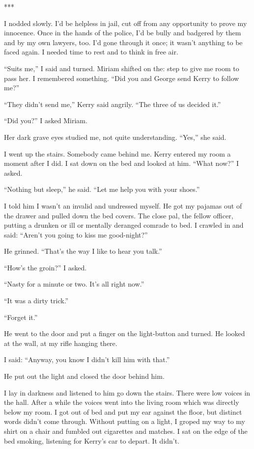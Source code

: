 \documentclass{novel}
\begin{document}
***

I nodded slowly. I’d be helpless in jail, cut off from any opportunity to prove my innocence. Once in the hands of the police, I’d be bully and badgered by them and by my own lawyers, too. I’d gone through it once; it wasn’t anything to be faced again. I needed time to rest and to think in free air.

“Suits me,” I said and turned. Miriam shifted on the: step to give me room to pass her. I remembered something. “Did you and George send Kerry to follow me?”

“They didn’t send me,” Kerry said angrily. “The three of us decided it.”

“Did you?” I asked Miriam.

Her dark grave eyes studied me, not quite understanding. “Yes,” she said.

I went up the stairs. Somebody came behind me. Kerry entered my room a moment after I did. I sat down on the bed and looked at him. “What now?” I asked.

“Nothing but sleep,” he said. “Let me help you with your shoes.”

I told him I wasn’t an invalid and undressed myself. He got my pajamas out of the drawer and pulled down the bed covers. The close pal, the fellow officer, putting a drunken or ill or mentally deranged comrade to bed. I crawled in and said: “Aren’t you going to kiss me good-night?”

He grinned. “That’s the way I like to hear you talk.”

“How’s the groin?” I asked.

“Nasty for a minute or two. It’s all right now.”

“It was a dirty trick.”

“Forget it.”

He went to the door and put a finger on the light-button and turned. He looked at the wall, at my rifle hanging there.

I said: “Anyway, you know I didn’t kill him with that.”

He put out the light and closed the door behind him.

I lay in darkness and listened to him go down the stairs. There were low voices in the hall. After a while the voices went into the living room which was directly below my room. I got out of bed and put my ear against the floor, but distinct words didn’t come through. Without putting on a light, I groped my way to my shirt on a chair and fumbled out cigarettes and matches. I sat on the edge of the bed smoking, listening for Kerry’s car to depart. It didn’t.
\end{document}
